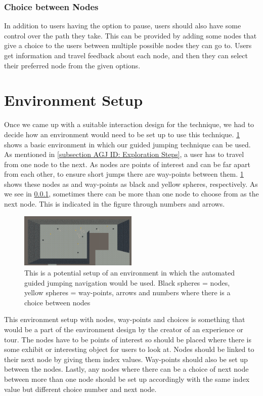 \subsubsection{Choice between Nodes}
\label{subsubsection AGJ ID ES: Choice between Nodes}
In addition to users having the option to pause, users should also have some control over the path they take. This can be provided by adding some nodes that give a choice to the users between multiple possible nodes they can go to. Users get information and travel feedback about each node, and then they can select their preferred node from the given options. 

\section{Environment Setup}
\label{section AGJ: Environment Setup}

Once we came up with a suitable interaction design for the technique, we had to decide how an environment would need to be set up to use this technique. \cref{fig:interaction-design-layout} shows a basic environment in which our guided jumping technique can be used. As mentioned in \cref{subsection AGJ ID: Exploration Steps}, a user has to travel from one node to the next. As nodes are points of interest and can be far apart from each other, to ensure short jumps there are way-points between them. \cref{fig:interaction-design-layout} shows these nodes as and way-points as black and yellow spheres, respectively. As we see in \cref{subsubsection AGJ ID ES: Choice between Nodes}, sometimes there can be more than one node to choose from as the next node. This is indicated in the figure through numbers and arrows.     
\begin{figure}[]
	\centering
	\includegraphics[width=0.5\textwidth]{images/interaction-design-layout.pdf} 
	\caption{This is a potential setup of an environment in which the automated guided jumping navigation would be used. Black spheres = nodes, yellow spheres = way-points, arrows and numbers where there is a choice between nodes}
	\label{fig:interaction-design-layout}
\end{figure}

This environment setup with nodes, way-points and choices is something that would be a part of the environment design by the creator of an experience or tour. The nodes have to be points of interest so should be placed where there is some exhibit or interesting object for users to look at. Nodes should be linked to their next node by giving them index values. Way-points should also be set up between the nodes. Lastly, any nodes where there can be a  choice of next node between more than one node should be set up accordingly with the same index value but different choice number and next node.
 
